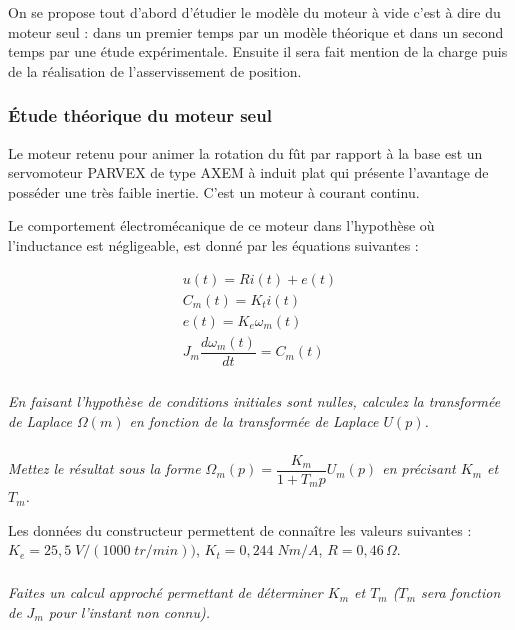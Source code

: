 \documentclass[11pt,oneside]{article}
\begin{document}
On se propose tout d’abord d’étudier le modèle du moteur à vide c’est à dire du moteur seul : dans un premier temps par un modèle théorique et dans un second temps par une étude expérimentale. Ensuite il sera fait mention de la charge puis de la réalisation de l’asservissement de position.


\subsubsection*{Étude théorique du moteur seul}


Le moteur retenu pour animer la rotation du fût par rapport à la base est un servomoteur PARVEX de type AXEM à induit plat qui présente l’avantage de posséder une très faible inertie. C’est un moteur à courant continu.

Le comportement électromécanique de ce moteur dans l’hypothèse où l’inductance est négligeable, est donné par les équations suivantes :

\begin{eqnarray*}
u(t)=Ri(t)+e(t) \\
C_m(t)=K_t i(t) \\
e(t)= K_e \omega_m(t) \\
J_m \dfrac{d\omega_m (t)}{dt} = C_m(t)
\end{eqnarray*}





\subparagraph{}
\textit{En faisant l’hypothèse de conditions initiales sont nulles, calculez la transformée de Laplace $\Omega(m)$ en fonction de la transformée de Laplace $U(p)$.}



\subparagraph{}
\textit{Mettez le résultat sous la forme $\Omega_m(p)=\dfrac{K_m}{1+T_m p} U_m(p)$ en précisant $K_m$ et $T_m$.}



Les données du constructeur permettent de connaître les valeurs suivantes : $K_e=25,5\; V/(1000\; tr/min))$, $K_t=0,244 \; Nm/A$, $R=0,46\, \Omega$.



\subparagraph{}
\textit{Faites un calcul approché permettant de déterminer $K_m$ et $T_m$ ($T_m$  sera fonction de $J_m$  pour l’instant non connu).}
\end{document}
